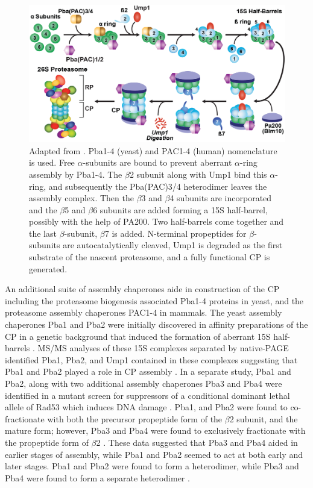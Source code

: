 \begin{figure}
	\centering
	\includegraphics[width=\columnwidth]{intro/cpassembly.png}
	{Adapted from \citep{hirano08}. Pba1-4 (yeast) and PAC1-4 (human) nomenclature is used. Free $\alpha$-subunits are bound to prevent aberrant $\alpha$-ring assembly by Pba1-4. The $\beta$2 subunit along with Ump1 bind this $\alpha$-ring, and subsequently the Pba(PAC)3/4 heterodimer leaves the assembly complex. Then the $\beta$3 and $\beta$4 subunits are incorporated and the $\beta$5 and $\beta$6 subunits are added forming a 15S half-barrel, possibly with the help of PA200. Two half-barrels come together and the last $\beta$-subunit, $\beta$7 is added. N-terminal propeptides for $\beta$-subunits are autocatalytically cleaved, Ump1 is degraded as the first substrate of the nascent proteasome, and a fully functional CP is generated.}
	\label{fig:cpassembly}
\end{figure}
 
	An additional suite of assembly chaperones aide in construction of the CP including the proteasome biogenesis associated Pba1-4 proteins in yeast, and the proteasome assembly chaperones PAC1-4 in mammals. The yeast assembly chaperones Pba1 and Pba2 were initially discovered in affinity preparations of the CP in a genetic background that induced the formation of aberrant 15S half-barrels \citep{li07}. MS/MS analyses of these 15S complexes separated by native-PAGE identified Pba1, Pba2, and Ump1 contained in these complexes suggesting that Pba1 and Pba2 played a role in CP assembly \citep{li07}. In a separate study, Pba1 and Pba2, along with two additional assembly chaperones Pba3 and Pba4 were identified in a mutant screen for suppressors of a conditional dominant lethal allele of Rad53 which induces DNA damage \citep{le07}. Pba1, and Pba2 were found to co-fractionate with both the precursor propeptide form of the $\beta$2 subunit, and the mature form; however, Pba3 and Pba4 were found to exclusively fractionate with the propeptide form of $\beta$2 \citep{le07}. These data suggested that Pba3 and Pba4 aided in earlier stages of assembly, while Pba1 and Pba2 seemed to act at both early and later stages. Pba1 and Pba2 were found to form a heterodimer, while Pba3 and Pba4 were found to form a separate heterodimer \citep{le07}.
	
